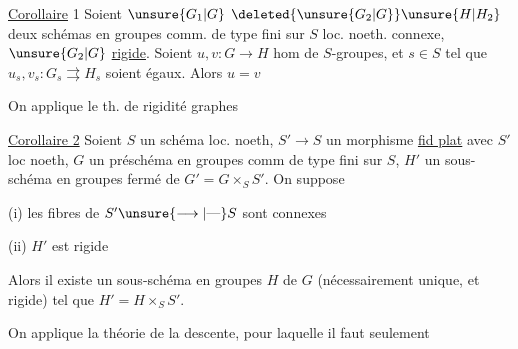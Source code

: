 \uline{Corollaire} 1 Soient $\unsure{G_1|G}$ $\deleted{\unsure{G_2|G}}\unsure{H|H_2}$ deux  schémas en groupes comm. de type fini sur $S$ loc. noeth. connexe, $\unsure{G_2|G}$ \uline{rigide}. Soient $u,v:G\longrightarrow H$  hom de $S$-groupes, et $s\in S$ tel que $u_s,v_s:G_s\rightrightarrows H_s$ soient égaux. Alors $u=v$

On applique le th. de rigidité  graphes

\uline{Corollaire 2} Soient $S$ un schéma loc. noeth, $S'\longrightarrow S$ un morphisme \uline{fid plat}  avec $S'$ loc noeth, $G$ un préschéma en groupes comm de type fini sur $S$, $H'$ un sous-schéma en groupes fermé de $G'=G\times_S S'$. On suppose

(i) les fibres de $S'\unsure{\longrightarrow|\text{---}}S$ sont  connexes

(ii) $H'$ est rigide

Alors il existe un sous-schéma en groupes  $H$ de $G$ (nécessairement unique, et rigide) tel que $H'=H\times_S S'$.

On applique la théorie de la descente, pour laquelle il faut seulement
